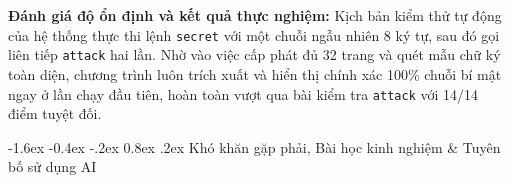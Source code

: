 \documentclass[11pt,a4paper]{article}
\makeatletter
\renewcommand\section{\@startsection {section}{1}{\z@}%
                                   {-1.6ex \@plus -0.4ex \@minus -.2ex}%
                                   {0.8ex \@plus .2ex}%
                                   {\normalfont\large\bfseries\color{headerblue}}}
\makeatother
\begin{document}
\noindent\textbf{Đánh giá độ ổn định và kết quả thực nghiệm:} Kịch bản kiểm thử tự động của hệ thống thực thi lệnh \texttt{secret} với một chuỗi ngẫu nhiên 8 ký tự, sau đó gọi liên tiếp \texttt{attack} hai lần. Nhờ vào việc cấp phát đủ 32 trang và quét mẫu chữ ký toàn diện, chương trình luôn trích xuất và hiển thị chính xác 100\% chuỗi bí mật ngay ở lần chạy đầu tiên, hoàn toàn vượt qua bài kiểm tra \texttt{attack} với 14/14 điểm tuyệt đối.

\clearpage

\section{Khó khăn gặp phải, Bài học kinh nghiệm \& Tuyên bố sử dụng AI}
\end{document}
